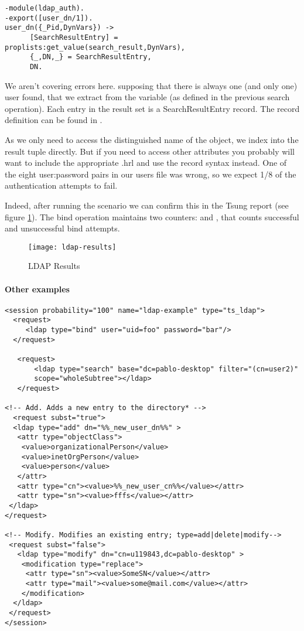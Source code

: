 \documentclass{IDXDOC-en}
\begin{document}
\begin{Verbatim}
-module(ldap_auth).
-export([user_dn/1]).
user_dn({_Pid,DynVars}) ->
      [SearchResultEntry] = proplists:get_value(search_result,DynVars),
      {_,DN,_} = SearchResultEntry,
      DN.
\end{Verbatim}

We aren't covering errors here. supposing that there is always one (and only one) user found, that we extract from the  variable (as defined in the previous search operation).
Each entry in the result set is a SearchResultEntry record. The record definition can be found in .

As we only need to access the distinguished name of the object, we index into the result tuple directly. But if you need to access other attributes you probably will want to include the appropriate .hrl and use the record syntax instead. One of the eight user:password pairs in our users file was wrong, so we expect 1/8 of the authentication attempts to fail.

Indeed, after running the scenario we can confirm this in the Tsung
report (see figure \ref{fig:ldap:results}). The bind operation maintains two
counters:  and ,
that counts successful and unsuccessful bind attempts.

\begin{figure}[htb]
  \begin{center}
    \texttt{[image: ldap-results]}
    \end{center}
      \caption{LDAP Results}
    \label{fig:ldap:results}
\end{figure}

\paragraph{Other examples}

\begin{Verbatim}
<session probability="100" name="ldap-example" type="ts_ldap">
  <request>
     <ldap type="bind" user="uid=foo" password="bar"/>
  </request>

   <request>
       <ldap type="search" base="dc=pablo-desktop" filter="(cn=user2)"
       scope="wholeSubtree"></ldap>
   </request>

<!-- Add. Adds a new entry to the directory* -->
  <request subst="true">
  <ldap type="add" dn="%%_new_user_dn%%" >
   <attr type="objectClass">
    <value>organizationalPerson</value>
    <value>inetOrgPerson</value>
    <value>person</value>
   </attr>
   <attr type="cn"><value>%%_new_user_cn%%</value></attr>
   <attr type="sn"><value>fffs</value></attr>
 </ldap>
</request>

<!-- Modify. Modifies an existing entry; type=add|delete|modify-->
 <request subst="false">
   <ldap type="modify" dn="cn=u119843,dc=pablo-desktop" >
    <modification type="replace">
     <attr type="sn"><value>SomeSN</value></attr>
     <attr type="mail"><value>some@mail.com</value></attr>
    </modification>
  </ldap>
 </request>
</session>
\end{Verbatim}
\end{document}
